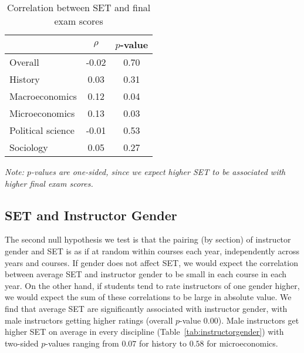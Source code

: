 \documentclass[12pt]{article}
\begin{document}
\begin{table}[htbp]
  \centering
  \footnotesize 
  \caption{Correlation between SET and final exam scores}
    \begin{tabular}{lcc}
    \toprule 
                        & $\rho$  & $p$-value  \\
   \midrule
    Overall &            -0.02 &       0.70  \\
    History &             0.03 &       0.31  \\
    Macroeconomics &      0.12 &       0.04  \\
    Microeconomics &      0.13 &       0.03  \\
    Political science &  -0.01 &       0.53  \\
    Sociology &           0.05 &       0.27  \\
    \bottomrule
    \end{tabular}%
 \label{tab:finalexam}%
 
\textit{Note: $p$-values are one-sided, since we expect higher SET to be associated
with higher final exam scores.}
\end{table}%
\normalsize


\subsection{SET and Instructor Gender} \label{sec:Fr-set-gender}
The second null hypothesis we test is that the pairing (by section) of 
instructor gender and SET is as if at random within courses each year, independently
across years and courses.
If gender does not affect SET, we would expect the correlation between average SET
and instructor gender to be small in each course in each year.
On the other hand, if students tend to rate instructors of one gender higher, we would
expect the sum of these correlations to be large in absolute value.
We find that average SET are significantly associated with instructor gender, with male instructors
getting higher ratings (overall $p$-value 0.00). 
Male instructors get higher SET on average in every discipline  (Table~\ref{tab:instructorgender})
with two-sided $p$-values ranging from $0.07$ for history to $0.58$ for microeconomics.
\end{document}
